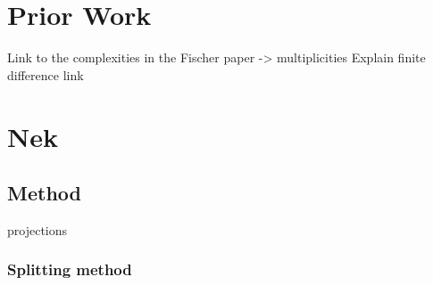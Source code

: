 \documentclass{sig-alternate}
\begin{document}


\section{Prior Work}
Link to the complexities in the Fischer paper -> multiplicities
Explain finite difference link
\section{Nek}

\subsection{Method}
projections

\subsubsection{Splitting method}
\end{document}
